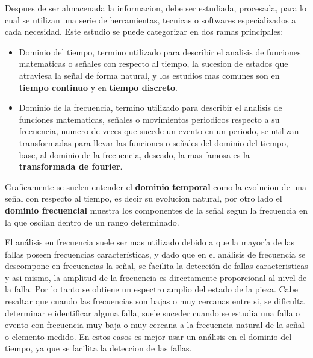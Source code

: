 Despues de ser almacenada la informacion, debe ser estudiada, procesada, para lo
cual se utilizan una serie de herramientas, tecnicas o softwares especializados
a cada necesidad. Este estudio se puede categorizar en dos ramas principales:

\begin{itemize}
    \item Dominio del tiempo, termino utilizado para describir el analisis
        de funciones matematicas o señales con respecto al tiempo, la sucesion
        de estados que atraviesa la señal de forma natural, y los estudios mas
        comunes son en  \textbf{tiempo continuo} y en \textbf{tiempo discreto}.

    \item Dominio de la frecuencia, termino utilizado para describir el analisis
        de funciones matematicas, señales o movimientos periodicos respecto a
        su frecuencia, numero de veces que sucede un evento en un periodo, se
        utilizan transformadas para llevar las funciones o señales del dominio
        del tiempo, base, al dominio de la frecuencia, deseado, la mas famosa es
        la \textbf{transformada de fourier}.
\end{itemize}


Graficamente se suelen entender el \textbf{dominio temporal} como la evolucion
de una señal con respecto al tiempo, es decir su evolucion natural, por otro
lado el \textbf{dominio frecuencial} muestra los componentes de la señal segun
la frecuencia en la que oscilan dentro de un rango determinado.



El análisis en frecuencia suele ser mas utilizado debido a que
la mayoría de las fallas poseen frecuencias características, y dado que en  el
análisis de frecuencia se descompone en frecuencias la señal, se facilita la
detección de fallas caracteristicas y asi mismo, la amplitud de la frecuencia es
directamente proporcional al nivel de la falla. Por lo tanto se obtiene un
espectro amplio del estado de la pieza.
Cabe resaltar que cuando las frecuencias son bajas o muy cercanas entre si,
se dificulta determinar e identificar alguna falla, suele suceder cuando se
estudia una falla o evento con frecuencia muy baja o muy cercana a la frecuencia
natural de la señal o elemento medido. En estos casos es mejor
usar un análisis en el dominio del tiempo, ya que se facilita la
deteccion de las fallas.



